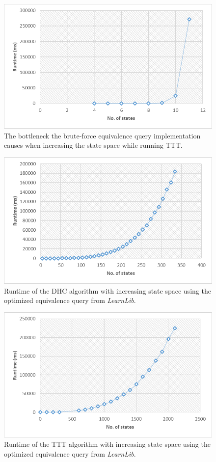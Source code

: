 \begin{figure}
	\centering
	\includegraphics[width=0.7\linewidth]{figures/stateruntimettt}
	\caption{The bottleneck the brute-force equivalence query implementation causes when increasing the state space while running TTT.}
	\label{fig:stateruntimettt}
\end{figure}

\begin{figure}
	\centering
	\includegraphics[width=0.7\linewidth]{figures/stateruntimeopt}
	\caption{Runtime of the DHC algorithm with increasing state space using the optimized equivalence query from \emph{LearnLib}.}
	\label{fig:stateruntimeopt}
\end{figure}


\begin{figure}
	\centering
	\includegraphics[width=0.7\linewidth]{figures/stateruntimeoptttt}
	\caption{Runtime of the TTT algorithm with increasing state space using the optimized equivalence query from \emph{LearnLib}.}
	\label{fig:stateruntimeoptttt}
\end{figure}



